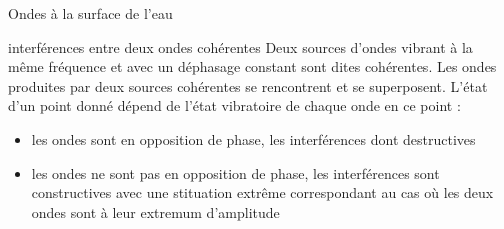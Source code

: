 \documentclass[a4paper,11pt,fleqn]{article}%
\begin{document}
\begin{minipage}[t]{.48\linewidth}
\begin{documentboxenv}{Ondes à la surface de l'eau}
\begin{center}
    \end{center}
  \end{documentboxenv}
  \end{minipage}\hspace{.02\linewidth}
  \begin{minipage}[t]{.5\linewidth}
    \begin{documentboxenv}{interférences entre deux ondes cohérentes}
    \label{doc2}
    Deux sources d'ondes vibrant à la même fréquence et avec un déphasage constant sont dites cohérentes. Les ondes produites par deux sources cohérentes se rencontrent et se superposent. L'état d'un point donné dépend de l'état vibratoire de chaque onde en ce point :
    \begin{itemize}
      \item les ondes sont en opposition de phase, les interférences dont destructives
      \item les ondes ne sont pas en opposition de phase, les interférences sont constructives avec une stituation extrême correspondant au cas où les deux ondes sont à leur extremum d'amplitude
    \end{itemize}
  \end{documentboxenv}
  \end{minipage}
\end{document}
